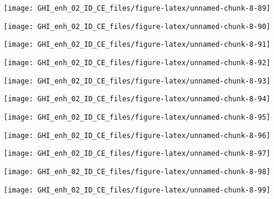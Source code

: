 \documentclass[
  10pt,
  a4paper,oneside]{article}
\begin{document}
\begin{center}\texttt{[image: GHI\_enh\_02\_ID\_CE\_files/figure-latex/unnamed-chunk-8-89]} \end{center}

\begin{center}\texttt{[image: GHI\_enh\_02\_ID\_CE\_files/figure-latex/unnamed-chunk-8-90]} \end{center}

\begin{center}\texttt{[image: GHI\_enh\_02\_ID\_CE\_files/figure-latex/unnamed-chunk-8-91]} \end{center}

\begin{center}\texttt{[image: GHI\_enh\_02\_ID\_CE\_files/figure-latex/unnamed-chunk-8-92]} \end{center}

\begin{center}\texttt{[image: GHI\_enh\_02\_ID\_CE\_files/figure-latex/unnamed-chunk-8-93]} \end{center}

\begin{center}\texttt{[image: GHI\_enh\_02\_ID\_CE\_files/figure-latex/unnamed-chunk-8-94]} \end{center}

\begin{center}\texttt{[image: GHI\_enh\_02\_ID\_CE\_files/figure-latex/unnamed-chunk-8-95]} \end{center}

\begin{center}\texttt{[image: GHI\_enh\_02\_ID\_CE\_files/figure-latex/unnamed-chunk-8-96]} \end{center}

\begin{center}\texttt{[image: GHI\_enh\_02\_ID\_CE\_files/figure-latex/unnamed-chunk-8-97]} \end{center}

\begin{center}\texttt{[image: GHI\_enh\_02\_ID\_CE\_files/figure-latex/unnamed-chunk-8-98]} \end{center}

\begin{center}\texttt{[image: GHI\_enh\_02\_ID\_CE\_files/figure-latex/unnamed-chunk-8-99]} \end{center}
\end{document}
